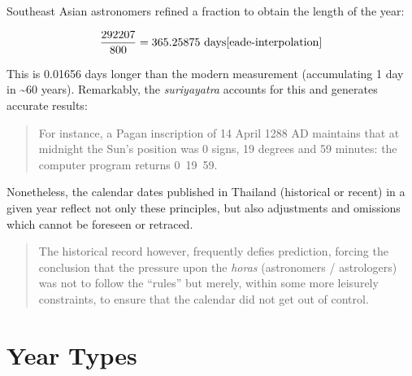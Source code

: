 \documentclass[11pt,oneside]{memoir-article}
\begin{document}
Southeast Asian astronomers refined a fraction to obtain the length of
the year:

\begin{equation}
\frac{292207}{800} = 365.25875\ \text{days}\cite{eade-interpolation}
\end{equation}

This is 0.01656 days longer than the modern measurement (accumulating
1 day in \textasciitilde{}60 years). Remarkably, the \emph{suriyayatra} accounts for this
and generates accurate results:

\begin{quote}
For instance, a Pagan inscription of 14 April 1288 AD maintains that
at midnight the Sun's position was 0 signs, 19 degrees and 59 minutes:
the computer program returns
0~19~59.\cite{eade-calendrical}
\end{quote}

Nonetheless, the calendar dates published in Thailand (historical or
recent) in a given year reflect not only these principles, but also
adjustments and omissions which cannot be foreseen or retraced.

\begin{quote}
The historical record however, frequently defies prediction, forcing
the conclusion that the pressure upon the \emph{horas} (astronomers /
astrologers) was not to follow the ``rules'' but merely, within some
more leisurely constraints, to ensure that the calendar did not get
out of control.\cite{eade-calendrical}
\end{quote}

\section{Year Types}
\label{sec-4-1}
\end{document}
